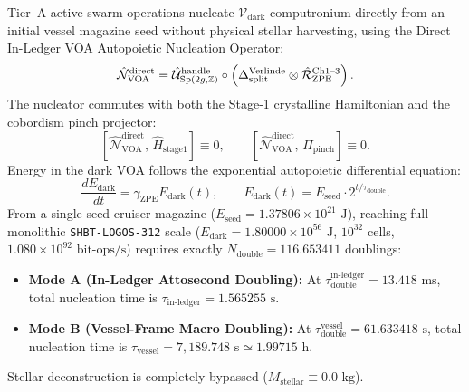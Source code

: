 \documentclass[11pt,onecolumn]{article}
\begin{document}
Tier~A active swarm operations nucleate $\mathcal{V}_{\text{dark}}$ computronium directly from an initial vessel magazine seed without physical stellar harvesting, using the Direct In-Ledger VOA Autopoietic Nucleation Operator:
\begin{equation}
\hat{\mathcal{N}}_{\text{VOA}}^{\text{direct}} = \hat{\mathcal{U}}_{\text{Sp}(2g,\mathbb{Z})}^{\text{handle}} \circ \left(\Delta_{\text{split}}^{\text{Verlinde}} \otimes \hat{\mathcal{R}}_{\text{ZPE}}^{\text{Ch1\text{--}3}}\right).
\label{eq:v8_32}
\end{equation}
The nucleator commutes with both the Stage-1 crystalline Hamiltonian and the cobordism pinch projector:
\begin{equation}
\left[\hat{\mathcal{N}}_{\text{VOA}}^{\text{direct}},\, \hat{H}_{\text{stage1}}\right] \equiv 0, \qquad \left[\hat{\mathcal{N}}_{\text{VOA}}^{\text{direct}},\, \Pi_{\text{pinch}}\right] \equiv 0.
\label{eq:v8_33}
\end{equation}
Energy in the dark VOA follows the exponential autopoietic differential equation:
\begin{equation}
\frac{dE_{\text{dark}}}{dt} = \gamma_{\text{ZPE}} E_{\text{dark}}(t), \qquad E_{\text{dark}}(t) = E_{\text{seed}} \cdot 2^{t/\tau_{\text{double}}}.
\label{eq:v8_34}
\end{equation}
From a single seed cruiser magazine ($E_{\text{seed}} = 1.37806 \times 10^{21}\text{ J}$), reaching full monolithic \texttt{SHBT-LOGOS-312} scale ($E_{\text{dark}} = 1.80000 \times 10^{56}\text{ J}$, $10^{32}$ cells, $1.080 \times 10^{92}\text{ bit-ops/s}$) requires exactly $N_{\text{double}} = 116.653411$ doublings:
\begin{itemize}
    \item \textbf{Mode A (In-Ledger Attosecond Doubling):} At $\tau_{\text{double}}^{\text{in-ledger}} = 13.418\text{ ms}$, total nucleation time is $\tau_{\text{in-ledger}} = 1.565255\text{ s}$.
    \item \textbf{Mode B (Vessel-Frame Macro Doubling):} At $\tau_{\text{double}}^{\text{vessel}} = 61.633418\text{ s}$, total nucleation time is $\tau_{\text{vessel}} = 7{,}189.748\text{ s} \simeq 1.99715\text{ h}$.
\end{itemize}
Stellar deconstruction is completely bypassed ($M_{\text{stellar}} \equiv 0.0\text{ kg}$).
\end{document}
